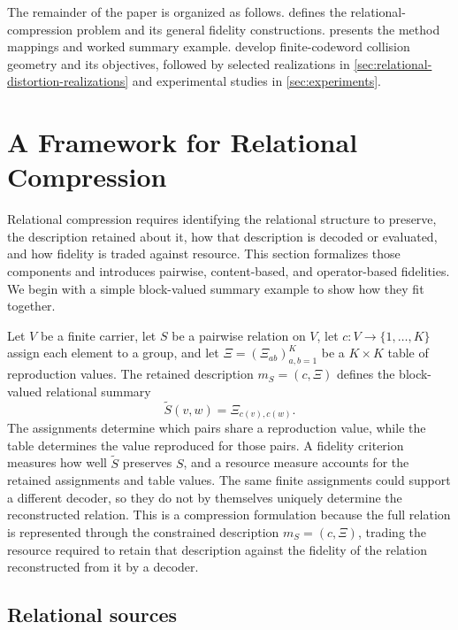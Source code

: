 The remainder of the paper is organized as follows.
 defines the relational-compression problem and its general fidelity constructions.
 presents the method mappings and worked summary example.
 develop finite-codeword collision geometry and its objectives, followed by selected realizations in \cref{sec:relational-distortion-realizations} and experimental studies in \cref{sec:experiments}.


\section{A Framework for Relational Compression}
\label{sec:relational-compression-framework}

Relational compression requires identifying the relational structure to preserve, the description retained about it, how that description is decoded or evaluated, and how fidelity is traded against resource.
This section formalizes those components and introduces pairwise, content-based, and operator-based fidelities.
We begin with a simple block-valued summary example to show how they fit together.

Let $V$ be a finite carrier, let $S$ be a pairwise relation on $V$, let $c:V\to\{1,\ldots,K\}$ assign each element to a group, and let $\Xi=(\Xi_{ab})_{a,b=1}^K$ be a $K\times K$ table of reproduction values.
The retained description $m_S=(c,\Xi)$ defines the block-valued relational summary
\begin{equation}
\widetilde S(v,w)=\Xi_{c(v),c(w)}.
\label{eq:block-valued-relational-summary}
\end{equation}
The assignments determine which pairs share a reproduction value, while the table determines the value reproduced for those pairs.
A fidelity criterion measures how well $\widetilde S$ preserves $S$, and a resource measure accounts for the retained assignments and table values.
The same finite assignments could support a different decoder, so they do not by themselves uniquely determine the reconstructed relation.
This is a compression formulation because the full relation is represented through the constrained description $m_S=(c,\Xi)$, trading the resource required to retain that description against the fidelity of the relation reconstructed from it by a decoder.

\subsection{Relational sources}

